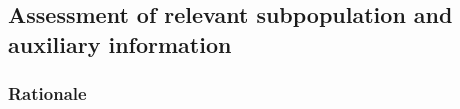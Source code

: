 \documentclass[utf8]{FrontiersinHarvard} %
\renewcommand*{\|}[1][]{\nonscript\:#1\vert\nonscript\:\mathopen{}}
\begin{document}








\bigskip%
\subsection{Assessment of relevant subpopulation and auxiliary information}
\label{sec:population_step}

\subsubsection{Rationale}
\label{sec:population_step_rationale}
\end{document}
